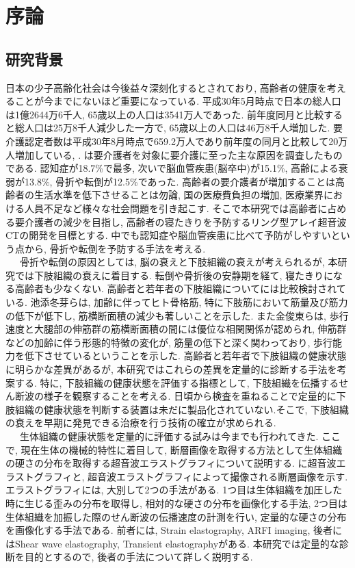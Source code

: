 \chapter{序論}
\newpage
\section{研究背景}
日本の少子高齢化社会は今後益々深刻化するとされており, 高齢者の健康を考えることが今までにないほど重要になっている. 平成30年5月時点で日本の総人口は1億2644万6千人, 65歳以上の人口は3541万人であった. 前年度同月と比較すると総人口は25万8千人減少した一方で, 65歳以上の人口は46万8千人増加した\cite{jinkou}. 要介護認定者数は平成30年8月時点で659.2万人であり前年度の同月と比較して20万人増加している\cite{youkaigo1}, \cite{youkaigo2}. は要介護者を対象に要介護に至った主な原因を調査したものである. 認知症が18.7\%で最多, 次いで脳血管疾患(脳卒中)が15.1\%, 高齢による衰弱が13.8\%, 骨折や転倒が12.5\%であった\cite{kaigogenin}. 高齢者の要介護者が増加することは高齢者の生活水準を低下させることは勿論, 国の医療費負担の増加, 医療業界における人員不足など様々な社会問題を引き起こす. そこで本研究では高齢者に占める要介護者の減少を目指し, 高齢者の寝たきりを予防するリング型アレイ超音波CTの開発を目標とする. 中でも認知症や脳血管疾患に比べて予防がしやすいという点から, 骨折や転倒を予防する手法を考える.
\\\ \ \ 骨折や転倒の原因としては, 脳の衰えと下肢組織の衰えが考えられるが, 本研究では下肢組織の衰えに着目する. 転倒や骨折後の安静期を経て, 寝たきりになる高齢者も少なくない. 高齢者と若年者の下肢組織についてには比較検討されている. 池添冬芽らは, 加齢に伴ってヒト骨格筋, 特に下肢筋において筋量及び筋力の低下が低下し, 筋横断面積の減少も著しいことを示した\cite{danmen}. また金俊東らは, 歩行速度と大腿部の伸筋群の筋横断面積の間には優位な相関関係が認められ, 伸筋群などの加齢に伴う形態的特徴の変化が, 筋量の低下と深く関わっており, 歩行能力を低下させているということを示した\cite{hokou}. 高齢者と若年者で下肢組織の健康状態に明らかな差異があるが, 本研究ではこれらの差異を定量的に診断する手法を考案する. 特に, 下肢組織の健康状態を評価する指標として, 下肢組織を伝播するせん断波の様子を観察することを考える. 日頃から検査を重ねることで定量的に下肢組織の健康状態を判断する装置は未だに製品化されていない.そこで, 下肢組織の衰えを早期に発見できる治療を行う技術の確立が求められる. 
\\\ \ \ 生体組織の健康状態を定量的に評価する試みは今までも行われてきた. ここで, 現在生体の機械的特性に着目して, 断層画像を取得する方法として生体組織の硬さの分布を取得する超音波エラストグラフィについて説明する.  に超音波エラストグラフィと, 超音波エラストグラフィによって撮像される断層画像を示す. エラストグラフィには, 大別して2つの手法がある. 1つ目は生体組織を加圧した時に生じる歪みの分布を取得し,  相対的な硬さの分布を画像化する手法, 2つ目は生体組織を加振した際のせん断波の伝播速度の計測を行い, 定量的な硬さの分布を画像化する手法である. 前者には, Strain elastography, ARFI imaging, 後者にはShear wave elastography, Transient elastographyがある. 本研究では定量的な診断を目的とするので, 後者の手法について詳しく説明する. 
